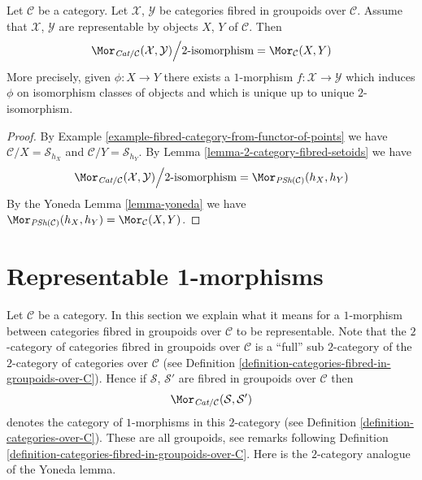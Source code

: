 \begin{lemma}
\label{lemma-morphisms-representable-fibred-categories}
Let $\mathcal{C}$ be a category.
Let $\mathcal{X}$, $\mathcal{Y}$ be categories fibred in groupoids
over $\mathcal{C}$. Assume that $\mathcal{X}$, $\mathcal{Y}$
are representable by objects $X$, $Y$ of $\mathcal{C}$.
Then
$$
\Mor_{\textit{Cat}/\mathcal{C}}(\mathcal{X}, \mathcal{Y})
\Big/
2\text{-isomorphism}
=
\Mor_\mathcal{C}(X, Y)
$$
More precisely, given $\phi : X \to Y$ there exists a
$1$-morphism $f : \mathcal{X} \to \mathcal{Y}$ which induces
$\phi$ on isomorphism classes of objects and
which is unique up to unique $2$-isomorphism.
\end{lemma}

\begin{proof}
By
Example \ref{example-fibred-category-from-functor-of-points}
we have $\mathcal{C}/X = \mathcal{S}_{h_X}$ and
$\mathcal{C}/Y = \mathcal{S}_{h_Y}$. By
Lemma \ref{lemma-2-category-fibred-setoids}
we have
$$
\Mor_{\textit{Cat}/\mathcal{C}}(\mathcal{X}, \mathcal{Y})
\Big/
2\text{-isomorphism}
=
\Mor_{\textit{PSh}(\mathcal{C})}(h_X, h_Y)
$$
By the Yoneda
Lemma \ref{lemma-yoneda}
we have $\Mor_{\textit{PSh}(\mathcal{C})}(h_X, h_Y)
= \Mor_\mathcal{C}(X, Y)$.
\end{proof}







\section{Representable 1-morphisms}
\label{section-representable-1-morphisms}

\noindent
Let $\mathcal{C}$ be a category.
In this section we explain what it means for a $1$-morphism
between categories fibred in groupoids over $\mathcal{C}$
to be representable. Note that the $2$-category of categories
fibred in groupoids over $\mathcal{C}$ is a
``full'' sub $2$-category of the $2$-category of categories over
$\mathcal{C}$ (see
Definition \ref{definition-categories-fibred-in-groupoids-over-C}).
Hence if $\mathcal{S}$, $\mathcal{S}'$ are fibred in groupoids
over $\mathcal{C}$ then
$$
\Mor_{\textit{Cat}/\mathcal{C}}(\mathcal{S}, \mathcal{S}')
$$
denotes the category of $1$-morphisms in this $2$-category
(see Definition \ref{definition-categories-over-C}).
These are all groupoids, see remarks following
Definition \ref{definition-categories-fibred-in-groupoids-over-C}.
Here is the $2$-category analogue of the Yoneda lemma.

